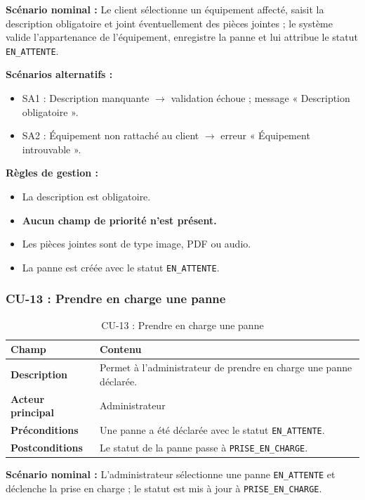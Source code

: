 \textbf{Scénario nominal :} Le client sélectionne un équipement affecté, saisit la description obligatoire et joint éventuellement des pièces jointes ; le système valide l'appartenance de l'équipement, enregistre la panne et lui attribue le statut \texttt{EN\_ATTENTE}.

\textbf{Scénarios alternatifs :}
\begin{itemize}
    \item SA1 : Description manquante $\rightarrow$ validation échoue ;
          message « Description obligatoire ».
    \item SA2 : Équipement non rattaché au client $\rightarrow$ erreur
          « Équipement introuvable ».
\end{itemize}

\textbf{Règles de gestion :}
\begin{itemize}
    \item La description est obligatoire.
    \item \textbf{Aucun champ de priorité n'est présent.}
    \item Les pièces jointes sont de type image, PDF ou audio.
    \item La panne est créée avec le statut \texttt{EN\_ATTENTE}.
\end{itemize}

\subsubsection{CU-13 : Prendre en charge une panne}

\begin{table}[H]
\centering
\caption{CU-13 : Prendre en charge une panne}
\label{tab:ch4:cu13}
\begin{tabular}{|p{3.5cm}|p{11cm}|}
\hline
\textbf{Champ} & \textbf{Contenu} \\
\hline
\textbf{Description}
  & Permet à l'administrateur de prendre en charge une panne déclarée. \\
\hline
\textbf{Acteur principal}
  & Administrateur \\
\hline
\textbf{Préconditions}
  & Une panne a été déclarée avec le statut \texttt{EN\_ATTENTE}. \\
\hline
\textbf{Postconditions}
  & Le statut de la panne passe à \texttt{PRISE\_EN\_CHARGE}. \\
\hline
\end{tabular}
\end{table}

\textbf{Scénario nominal :} L'administrateur sélectionne une panne \texttt{EN\_ATTENTE} et déclenche la prise en charge ; le statut est mis à jour à \texttt{PRISE\_EN\_CHARGE}.

